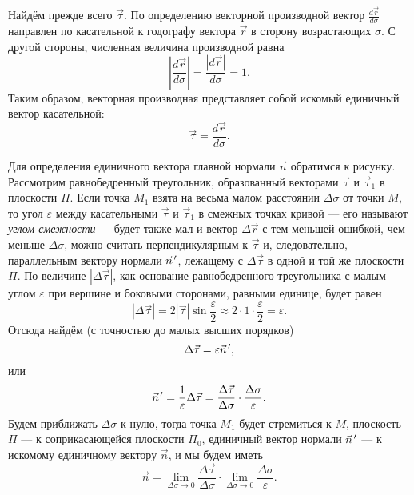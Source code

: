 \documentclass{article}
\theoremstyle{definition}
\theoremstyle{plain}
\theoremstyle{remark}
\numberwithin{equation}{section}
\newcommand{\wvec}[1]{\vec{#1}\mkern2mu\vphantom{#1}}
\newcommand{\pvec}[1]{\wvec{#1}'}
\newcommand{\abs}[1]{\left|#1\right|}
\newcommand{\der}[2][]{\frac{d #1}{d #2}}
\newcommand{\deltader}[2]{\frac{\Delta #1}{\Delta #2}}
\begin{document}
Найдём прежде всего $\vec{\tau}$. По определению векторной производной вектор
$\der[\vec{r}]{\sigma}$ направлен по касательной к годографу вектора $\vec{r}$
в сторону возрастающих $\sigma$. С другой стороны, численная величина
производной равна
\begin{equation*}
  \abs{\der[\vec{r}]{\sigma}} = \frac{\abs{d \vec{r}}}{d \sigma} = 1.
\end{equation*}
Таким образом, векторная производная представляет собой искомый единичный
вектор касательной:
\begin{equation}
  \vec{\tau} = \der[\vec{r}]{\sigma}.
\end{equation}

Для определения единичного вектора главной нормали $\vec{n}$ обратимся к
рисунку. Рассмотрим равнобедренный треугольник, образованный векторами
$\vec{\tau}$ и $\vec{\tau}_1$ в плоскости $\Pi$. Если точка $M_1$ взята на
весьма малом расстоянии $\Delta \sigma$ от точки $M$, то угол $\varepsilon$
между касательными $\vec{\tau}$ и $\vec{\tau}_1$ в смежных точках кривой ---
его называют \textit{углом смежности} --- будет также мал и вектор
$\Delta \vec{r}$ с тем меньшей ошибкой, чем меньше $\Delta \sigma$, можно
считать перпендикулярным к $\vec{\tau}$ и, следовательно, параллельным вектору
нормали $\pvec{n}$, лежащему с $\Delta \vec{\tau}$ в одной и той же плоскости
$\Pi$. По величине $\abs{\Delta \vec{\tau}}$, как основание равнобедренного
треугольника с малым углом $\varepsilon$ при вершине и боковыми сторонами,
равными единице, будет равен
\begin{equation*}
  \abs{\Delta \vec{\tau}} = 2 \abs{\vec{\tau}} \sin \frac{\varepsilon}{2}
    \approx 2 \cdot 1 \cdot \frac{\varepsilon}{2} = \varepsilon.
\end{equation*}
Отсюда найдём (с точностью до малых высших порядков)
\begin{equation*}
  \Delta \vec{\tau} = \varepsilon \pvec{n},
\end{equation*}
или
\begin{equation*}
  \pvec{n} = \frac{1}{\varepsilon} \Delta \vec{\tau} =
    \deltader{\vec{\tau}}{\sigma} \cdot \frac{\Delta \sigma}{\varepsilon}.
\end{equation*}
Будем приближать $\Delta \sigma$ к нулю, тогда точка $M_1$ будет стремиться к
$M$, плоскость $\Pi$ --- к соприкасающейся плоскости $\Pi_0$, единичный вектор
нормали $\pvec{n}$ --- к искомому единичному вектору $\vec{n}$, и мы будем
иметь
\begin{equation*}
  \vec{n} = \lim_{\Delta \sigma \to 0} \deltader{\vec{\tau}}{\sigma} \cdot
    \lim_{\Delta \sigma \to 0} \frac{\Delta \sigma}{\varepsilon}.
\end{equation*}
\end{document}
